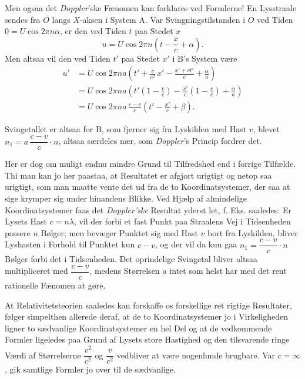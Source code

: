 \documentclass[12pt,a4paper]{article}
\newcommand{\opage}[1]{\marginnote{\footnotesize\textit{[#1]}}}
\begin{document}
Men ogsaa det \emph{Doppler}'ske Fænomen kan forklares ved Formlerne! En
Lysstraale sendes fra $O$ langs $X$-aksen i System A. Var Svingningstilstanden i
$O$ ved Tiden $0 = U \cos 2\pi n\alpha$, er den ved Tiden $t$ paa Stedet $x$
\opage{23} \[
  u = U \cos 2\pi n \left(t - \frac{x}{c} + \alpha\right).
\]
Men altsaa vil den ved Tiden $t'$ paa Stedet $x'$ i B's System være
\begin{align*}
  u' &= U \cos 2\pi na\left(t' + \frac{v}{c^{2}}\,x' - \frac{x' + vt'}{c}
        + \frac{\alpha}{a}\right)\\
     &= U \cos 2\pi na\left(t'\left(1 - \frac{v}{c}\right)
        - \frac{x'}{c}\left(1 - \frac{v}{c}\right) + \frac{\alpha}{a}\right)\\
     &= U \cos 2\pi na\,\frac{c - v}{c}\left(t' - \frac{x'}{c} + \beta\right).
\end{align*}

Svingetallet er altsaa for B, som fjerner sig fra Lyskilden med Hast $v$,
blevet $n_{1} = a\,\dfrac{c - v}{c}\cdot n$, altsaa særdeles nær, som
\guillemotleft\emph{Doppler}'s Princip\guillemotright{} fordrer det.

Her er dog om muligt endnu mindre Grund til Tilfredshed end i forrige Tilfælde.
Thi man kan jo her paastaa, at Resultatet er afgjort urigtigt og netop saa
urigtigt, som man maatte vente det ud fra de to Koordinatsystemer, der saa at
sige krymper sig under hinandens Blikke. Ved Hjælp af almindelige
Koordinatsystemer faas det \emph{Doppler'ske} Resultat yderst let, f. Eks.
saaledes: Er Lysets Hast $c = n\lambda$, vil der forbi et fast Punkt paa
Straalens Vej i Tidsenheden passere $n$ Bølger; men bevæger Punktet sig med
Hast $v$ bort fra Lyskilden, bliver Lyshasten i Forhold til Punktet kun
$c - v$, og der vil da kun gaa $n_{1} = \dfrac{c - v}{c}\cdot n$ Bølger forbi
det i Tidsenheden. Det oprindelige Svingetal bliver altsaa multipliceret med
$\dfrac{c - v}{c}$, medens Størrelsen $a$ intet som helst har med det rent
rationelle Fænomen at gøre.

At Relativitetsteorien saaledes kan forskaffe os forskellige ret rigtige
Resultater, følger simpelthen allerede deraf, at de to Koordinatsystemer jo i
Virkeligheden ligner to sædvanlige Koordinatsystemer en hel Del og at de
vedkommende Formler ligeledes paa Grund af Lysets store Hastighed og den
tilsvarende ringe Værdi af Størrelserne $\dfrac{v^{2}}{c^{2}}$ og
$\dfrac{v}{c^{2}}$ vedbliver at være nogenlunde brugbare. Var $c = \infty$, gik
samtlige Formler jo over til de sædvanlige.
\end{document}
